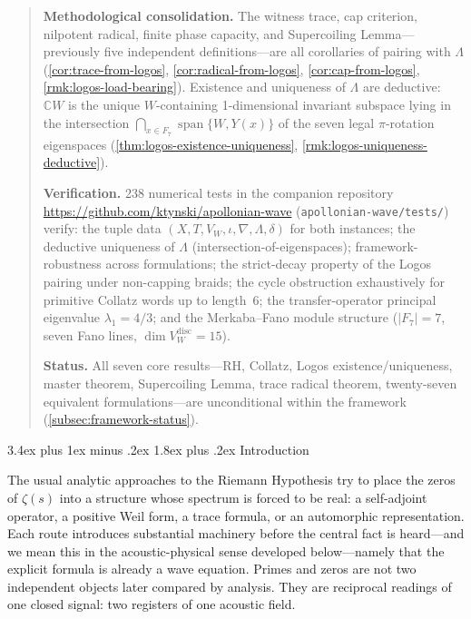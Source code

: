 \documentclass[11pt,a4paper]{article}
\makeatletter
\theoremstyle{plain}
\theoremstyle{definition}
\theoremstyle{remark}
\numberwithin{equation}{section}
\newcommand{\Complex}{\mathbb{C}}
\DeclareMathOperator{\spn}{span}
\renewcommand{\section}{%
  \@startsection{section}{1}{0pt}%
    {3.4ex plus 1ex minus .2ex}%
    {1.8ex plus .2ex}%
    {\normalfont\LARGE\bfseries\color{headingAccent}}%
}
\makeatother
\begin{document}
\begin{abstract}
\medskip\noindent
\textbf{Methodological consolidation.}  The witness trace, cap
criterion, nilpotent radical, finite phase capacity, and Supercoiling
Lemma---previously five independent definitions---are all corollaries
of pairing with \(\Lambda\)
(\cref{cor:trace-from-logos},
\cref{cor:radical-from-logos},
\cref{cor:cap-from-logos},
\cref{rmk:logos-load-bearing}).  Existence and uniqueness of
\(\Lambda\) are deductive: \(\Complex W\) is the unique
\(W\)-containing 1-dimensional invariant subspace lying in the
intersection \(\bigcap_{x\in F_7}\spn\{W,Y(x)\}\) of the seven legal
\(\pi\)-rotation eigenspaces
(\cref{thm:logos-existence-uniqueness},
\cref{rmk:logos-uniqueness-deductive}).

\medskip\noindent
\textbf{Verification.}  238 numerical tests in the companion
repository \url{https://github.com/ktynski/apollonian-wave}
(\texttt{apollonian-wave/tests/}) verify: the tuple data
\((X,T,V_W,\iota,\nabla,\Lambda,\delta)\) for both instances; the
deductive uniqueness of \(\Lambda\) (intersection-of-eigenspaces);
framework-robustness across formulations; the strict-decay property
of the Logos pairing under non-capping braids; the cycle obstruction
exhaustively for primitive Collatz words up to length~6; the
transfer-operator principal eigenvalue \(\lambda_1=4/3\); and the
Merkaba--Fano module structure (\(|F_7|=7\), seven Fano lines,
\(\dim V_W^{\mathrm{disc}}=15\)).

\medskip\noindent
\textbf{Status.}  All seven core results---RH, Collatz, Logos
existence/uniqueness, master theorem, Supercoiling Lemma, trace
radical theorem, twenty-seven equivalent formulations---are
unconditional within the framework
(\cref{subsec:framework-status}).
\end{abstract}

\tableofcontents

\section{Introduction}
\label{sec:intro}

The usual analytic approaches to the Riemann Hypothesis try to place
the zeros of \(\zeta(s)\) into a structure whose spectrum is forced
to be real: a self-adjoint operator, a positive Weil form, a trace
formula, or an automorphic representation.  Each route introduces
substantial machinery before the central fact is heard---and we mean
this in the acoustic-physical sense developed below---namely that
the explicit formula is already a wave equation.  Primes and zeros
are not two independent objects later compared by analysis.  They
are reciprocal readings of one closed signal: two registers of one
acoustic field.
\end{document}
